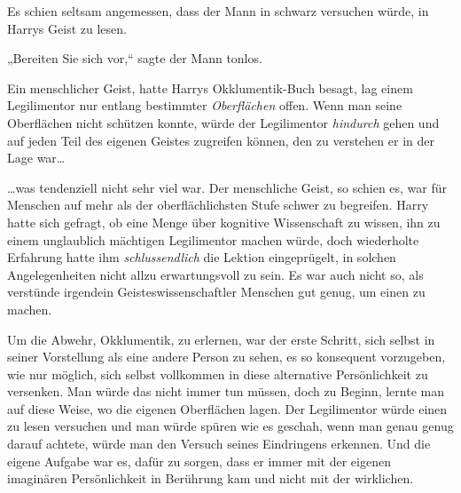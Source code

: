 Es schien seltsam angemessen, dass der Mann in schwarz versuchen würde, in Harrys Geist zu lesen.

„Bereiten Sie sich vor,“ sagte der Mann tonlos.

Ein menschlicher Geist, hatte Harrys Okklumentik-Buch besagt, lag einem Legilimentor nur entlang bestimmter \emph{Oberflächen} offen. Wenn man seine Oberflächen nicht schützen konnte, würde der Legilimentor \emph{hindurch} gehen und auf jeden Teil des eigenen Geistes zugreifen können, den zu verstehen er in der Lage war…

…was tendenziell nicht sehr viel war. Der menschliche Geist, so schien es, war für Menschen auf mehr als der oberflächlichsten Stufe schwer zu begreifen. Harry hatte sich gefragt, ob eine Menge über kognitive Wissenschaft zu wissen, ihn zu einem unglaublich mächtigen Legilimentor machen würde, doch wiederholte Erfahrung hatte ihm \emph{schlussendlich} die Lektion eingeprügelt, in solchen Angelegenheiten nicht allzu erwartungsvoll zu sein. Es war auch nicht so, als verstünde irgendein Geisteswissenschaftler Menschen gut genug, um einen zu machen.

Um die Abwehr, Okklumentik, zu erlernen, war der erste Schritt, sich selbst in seiner Vorstellung als eine andere Person zu sehen, es so konsequent vorzugeben, wie nur möglich, sich selbst vollkommen in diese alternative Persönlichkeit zu versenken. Man würde das nicht immer tun müssen, doch zu Beginn, lernte man auf diese Weise, wo die eigenen Oberflächen lagen. Der Legilimentor würde einen zu lesen versuchen und man würde spüren wie es geschah, wenn man genau genug darauf achtete, würde man den Versuch seines Eindringens erkennen. Und die eigene Aufgabe war es, dafür zu sorgen, dass er immer mit der eigenen imaginären Persönlichkeit in Berührung kam und nicht mit der wirklichen.

